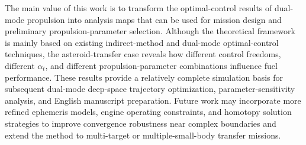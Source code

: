 ﻿\documentclass{IEEEtaes}
\begin{document}
The main value of this work is to transform the optimal-control results of dual-mode propulsion into analysis maps that can be used for mission design and preliminary propulsion-parameter selection. Although the theoretical framework is mainly based on existing indirect-method and dual-mode optimal-control techniques, the asteroid-transfer case reveals how different control freedoms, different $\alpha_t$, and different propulsion-parameter combinations influence fuel performance. These results provide a relatively complete simulation basis for subsequent dual-mode deep-space trajectory optimization, parameter-sensitivity analysis, and English manuscript preparation. Future work may incorporate more refined ephemeris models, engine operating constraints, and homotopy solution strategies to improve convergence robustness near complex boundaries and extend the method to multi-target or multiple-small-body transfer missions.




\end{document}
